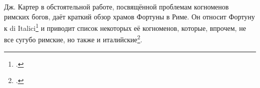 
Дж. Картер в обстоятельной работе, посвящённой проблемам когноменов римских богов, даёт краткий обзор храмов Фортуны в Риме. Он относит Фортуну к di Italici\footcite[P. 29--30]{Carter1898} и приводит список некоторых её когноменов, которые, впрочем, не все сугубо римские, но также и италийские\footcite[P. 61--62]{Carter1898}.



